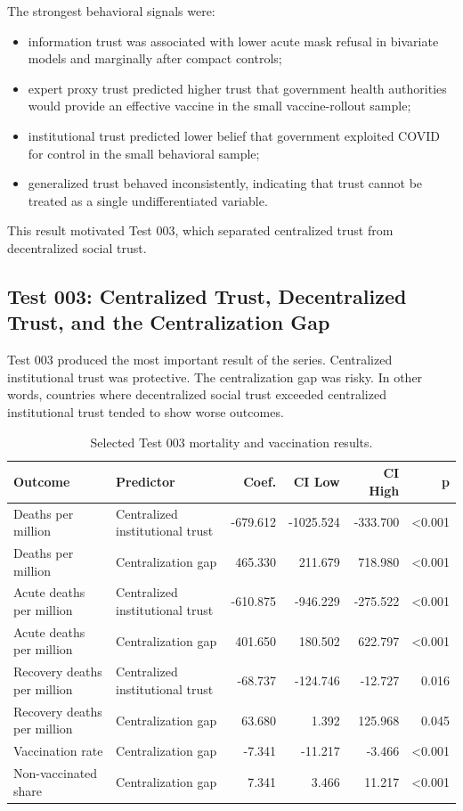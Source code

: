 \documentclass[12pt]{article}
\begin{document}
The strongest behavioral signals were:

\begin{itemize}
  \item information trust was associated with lower acute mask refusal in bivariate models and marginally after compact controls;
  \item expert proxy trust predicted higher trust that government health authorities would provide an effective vaccine in the small vaccine-rollout sample;
  \item institutional trust predicted lower belief that government exploited COVID for control in the small behavioral sample;
  \item generalized trust behaved inconsistently, indicating that trust cannot be treated as a single undifferentiated variable.
\end{itemize}

This result motivated Test 003, which separated centralized trust from decentralized social trust.

\subsection{Test 003: Centralized Trust, Decentralized Trust, and the Centralization Gap}

Test 003 produced the most important result of the series. Centralized institutional trust was protective. The centralization gap was risky. In other words, countries where decentralized social trust exceeded centralized institutional trust tended to show worse outcomes.

\begin{table}[htbp]
\centering
\small
\caption{Selected Test 003 mortality and vaccination results.}
\begin{tabular}{llrrrr}
\toprule
Outcome & Predictor & Coef. & CI Low & CI High & p \\
\midrule
Deaths per million & Centralized institutional trust & -679.612 & -1025.524 & -333.700 & <0.001 \\
Deaths per million & Centralization gap & 465.330 & 211.679 & 718.980 & <0.001 \\
Acute deaths per million & Centralized institutional trust & -610.875 & -946.229 & -275.522 & <0.001 \\
Acute deaths per million & Centralization gap & 401.650 & 180.502 & 622.797 & <0.001 \\
Recovery deaths per million & Centralized institutional trust & -68.737 & -124.746 & -12.727 & 0.016 \\
Recovery deaths per million & Centralization gap & 63.680 & 1.392 & 125.968 & 0.045 \\
Vaccination rate & Centralization gap & -7.341 & -11.217 & -3.466 & <0.001 \\
Non-vaccinated share & Centralization gap & 7.341 & 3.466 & 11.217 & <0.001 \\
\bottomrule
\end{tabular}
\end{table}
\end{document}
